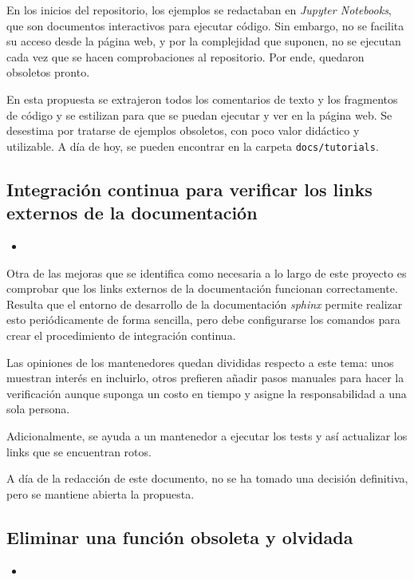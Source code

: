 En los inicios del \gls{repositorio}, los ejemplos se redactaban en \textit{Jupyter Notebooks}, que son documentos interactivos para ejecutar código. Sin embargo, no se facilita su acceso desde la página web, y por la complejidad que suponen, no se ejecutan cada vez que se hacen comprobaciones al repositorio. Por ende, quedaron obsoletos pronto.

En esta propuesta se extrajeron todos los comentarios de texto y los fragmentos de código y se estilizan para que se puedan ejecutar y ver en la página web. Se desestima por tratarse de ejemplos obsoletos, con poco valor didáctico y utilizable. A día de hoy, se pueden encontrar en la carpeta \texttt{docs/tutorials}.

\subsection{Integración continua para verificar los links externos de la documentación}

\begin{itemize}
    \item {}
\end{itemize}

Otra de las mejoras que se identifica como necesaria a lo largo de este proyecto es comprobar que los links externos de la documentación funcionan correctamente. Resulta que el \gls{entorno de desarrollo} de la documentación \textit{sphinx} permite realizar esto periódicamente de forma sencilla, pero debe configurarse los comandos para crear el procedimiento de integración continua.

Las opiniones de los mantenedores quedan divididas respecto a este tema: unos muestran interés en incluirlo, otros prefieren añadir pasos manuales para hacer la verificación aunque suponga un costo en tiempo y asigne la responsabilidad a una sola persona.

Adicionalmente, se ayuda a un mantenedor a ejecutar los tests y así actualizar los links que se encuentran rotos.

A día de la redacción de este documento, no se ha tomado una decisión definitiva, pero se mantiene abierta la propuesta.

\subsection{Eliminar una función obsoleta y olvidada}

\begin{itemize}
    \item {}
\end{itemize}

